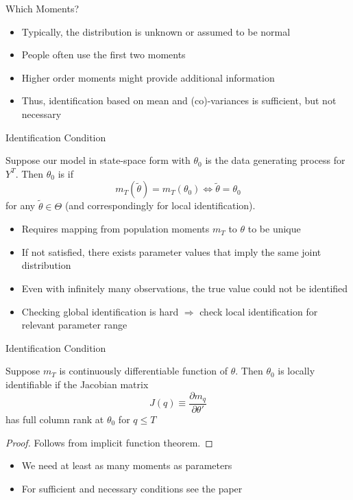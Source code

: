\begin{frame}{Which Moments?}
\begin{itemize}
\item Typically, the distribution is unknown or assumed to be normal
\item People often use the first two moments
\item Higher order moments might provide additional information \parencite[see e.g.][]{FV2007}
\item Thus, identification based on mean and (co)-variances is sufficient, but not necessary
\end{itemize}
\end{frame}

\begin{frame}{Identification Condition}
\begin{theorem}
  Suppose our model in state-space form with $\theta_0$ is the data generating process for $Y^T$. Then $\theta_0$ is  if
  \begin{equation}
  {m_T}\left( {\tilde \theta } \right) = {m_T}\left( {{\theta _0}} \right) \Leftrightarrow \tilde \theta  = {\theta _0}
  \end{equation}
  for any $\tilde \theta \in \Theta$ (and correspondingly for local identification).
\end{theorem}
\begin{itemize}
\item Requires mapping from population moments ${m_T}$ to $\theta$ to be unique
\item If not satisfied, there exists parameter values that imply the same joint distribution
\item[$\Rightarrow$] Even with infinitely many observations, the true value could not be identified
\item Checking global identification is hard $\Rightarrow$ check local identification for relevant parameter range
\end{itemize}
\end{frame}


\begin{frame}{Identification Condition}
\begin{theorem}
  Suppose $m_T$ is continuously differentiable function of $\theta$. Then $\theta_0$ is locally identifiable if the Jacobian matrix
  \begin{equation}
  J(q) \equiv \frac{{\partial {m_q}}}{{\partial \theta '}} \label{eq:Jacobian}
  \end{equation}
  has full column rank at $\theta_0$ for $q\leq T$
\end{theorem}
\begin{proof}
  Follows from implicit function theorem.
\end{proof}
\begin{itemize}
\item We need at least as many moments as parameters
\item For sufficient and necessary conditions see the paper
\end{itemize}
\end{frame}

